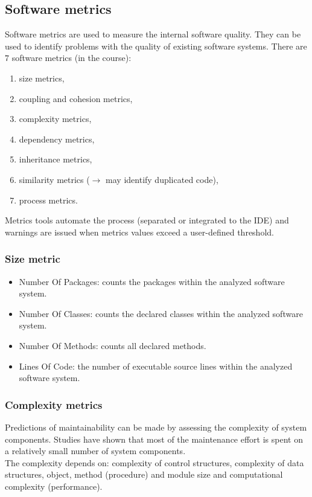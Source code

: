 \documentclass[a4paper,11pt]{report}
\begin{document}
\subsection{Software metrics}
Software metrics are used to measure the internal software quality. They can be
used to identify problems with the quality of existing software systems.
There are $7$ software metrics (in the course):
\begin{enumerate}
\item size metrics,
\item coupling and cohesion metrics,
\item complexity metrics,
\item dependency metrics,
\item inheritance metrics,
\item similarity metrics ($\rightarrow$ may identify duplicated code),
\item process metrics.
\end{enumerate}

Metrics tools automate the process (separated or integrated to the IDE) and
warnings are issued when metrics values exceed a user-defined threshold.

\subsubsection{Size metric}
\begin{itemize}
\item Number Of Packages: counts the packages within the analyzed software
system.
\item Number Of Classes: counts the declared classes within the analyzed
software system.
\item Number Of Methods: counts all declared methods.
\item Lines Of Code: the number of executable source lines within the analyzed
software system.
\end{itemize}

\subsubsection{Complexity metrics}
Predictions of maintainability can be made by assessing the complexity of system
components. Studies have shown that most of the maintenance effort is spent on a
relatively small number of system components.\\

The complexity depends on: complexity of control structures, complexity of data
structures, object, method (procedure) and module size and computational
complexity (performance).
\end{document}
